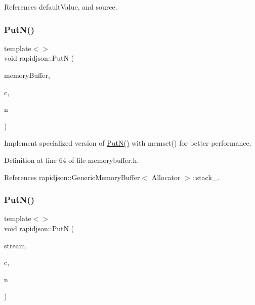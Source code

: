 References default\+Value, and source.

\mbox{\label{namespacerapidjson_aba27b0c8dcf724aa2b288a24fda0811b}} 
\subsubsection{\texorpdfstring{PutN()}{PutN()}\hspace{0.1cm}{\footnotesize\ttfamily [1/4]}}
{\footnotesize\ttfamily template$<$$>$ \\
void rapidjson\+::\+PutN (\begin{DoxyParamCaption}\item[{\mbox{\hyperlink{namespacerapidjson_acb643b9055e7988f4cb89ce4f7e6b115}{Memory\+Buffer}} \&}]{memory\+Buffer,  }\item[{char}]{c,  }\item[{size\+\_\+t}]{n }\end{DoxyParamCaption})}



Implement specialized version of \mbox{\hyperlink{namespacerapidjson_a1ac13bac5976fc06587e00fc0bcfb32a}{Put\+N()}} with memset() for better performance. 



Definition at line 64 of file memorybuffer.\+h.


\begin{DoxyCode}{0}

\end{DoxyCode}


References rapidjson\+::\+Generic\+Memory\+Buffer$<$ Allocator $>$\+::stack\+\_\+.

\mbox{\label{namespacerapidjson_a1ac13bac5976fc06587e00fc0bcfb32a}} 
\subsubsection{\texorpdfstring{PutN()}{PutN()}\hspace{0.1cm}{\footnotesize\ttfamily [2/4]}}
{\footnotesize\ttfamily template$<$$>$ \\
void rapidjson\+::\+PutN (\begin{DoxyParamCaption}\item[{\mbox{\hyperlink{classrapidjson_1_1_file_write_stream}{File\+Write\+Stream}} \&}]{stream,  }\item[{char}]{c,  }\item[{size\+\_\+t}]{n }\end{DoxyParamCaption})}



